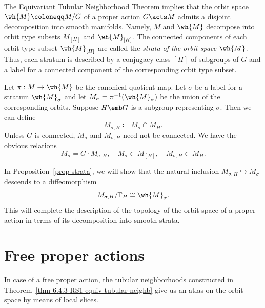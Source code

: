 \begin{rem}[Strata]\label{rem strata}
    The Equivariant Tubular Neighborhood Theorem implies that the orbit space $\wh{M}\coloneqq M\slash G$ of a proper action $G\acts M$ admits a disjoint decomposition into smooth manifolds. Namely, $M$ and $\wh{M}$ decompose into orbit type subsets $M_{[H]}$ and $\wh{M}_{[H]}$. The connected components of each orbit type subset $\wh{M}_{[H]}$ are called the \emph{strata of the orbit space $\wh{M}$}. Thus, each stratum is described by a conjugacy class $[H]$ of subgroups of $G$ and a label for a connected component of the corresponding orbit type subset. 
    
    Let $\pi:M\to \wh{M}$ be the canonical quotient map. Let $\sigma$ be a label for a stratum $\wh{M}_\sigma$ and let $M_\sigma=\pi^{-1}(\wh{M}_\sigma)$ be the union of the corresponding orbits. Suppose $H\emb G$ is a subgroup representing $\sigma$. Then we can define 
    \[M_{\sigma,H}\coloneqq M_\sigma\cap M_H.\]
    Unless $G$ is connected, $M_\sigma$ and $M_{\sigma,H}$ need not be connected. We have the obvious relations
    \[M_\sigma=G\cdot M_{\sigma,H},\quad M_\sigma\subset M_{[H]},\quad M_{\sigma,H}\subset M_H.\]

    In Proposition~\ref{prop strata}, we will show that the natural inclusion $M_{\sigma,H}\hookrightarrow M_\sigma$ descends to a diffeomorphism 
    \[M_{\sigma,H}\slash \Gamma_H\cong \wh{M}_\sigma.\] 
    This will complete the description of the topology of the orbit space of a proper action in terms of its decomposition into smooth strata.
\end{rem}









\section{Free proper actions}\label{sec: free proper actions}

In case of a free proper action, the tubular neighborhoods constructed in Theorem~\ref{thm 6.4.3 RS1 equiv tubular neighb} give us an atlas on the orbit space by means of local slices.

